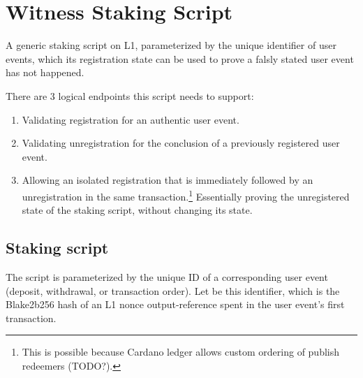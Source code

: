 \documentclass[../midgard.tex]{subfiles}
\begin{document}
\section{Witness Staking Script}
\label{h:witness}

A generic staking script on L1, parameterized by the unique identifier of user events, which its registration state can be used to prove a falsly stated user event has not happened.

There are 3 logical endpoints this script needs to support:
\begin{enumerate}
    \item Validating registration for an authentic user event.
    \item Validating unregistration for the conclusion of a previously registered user event.
    \item Allowing an isolated registration that is immediately followed by an unregistration in the same transaction.\footnote{This is possible because Cardano ledger allows custom ordering of publish redeemers (TODO?).}
      Essentially proving the unregistered state of the staking script, without changing its state.
\end{enumerate}

\subsection{Staking script}
\label{h:witness-staking-script}
The  script is parameterized by the unique ID of a corresponding user event (deposit, withdrawal, or transaction order).
Let  be this identifier, which is the Blake2b256 hash of an L1 nonce output-reference spent in the user event's first transaction.
\end{document}
